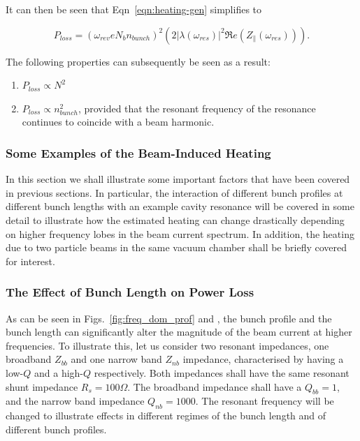 It can then be seen that Eqn~\ref{eqn:heating-gen} simplifies to

\begin{equation}
P_{loss} = \left( \omega_{rev}eN_{b}n_{bunch}  \right)^{2}  \left( 2 \left| \lambda \left( \omega_{res} \right)  \right|^{2}  \Re{}e \left( Z_{\parallel} \left(\omega_{res} \right) \right) \right). 
\label{ean:heating-high-q}
\end{equation}

The following properties can subsequently be seen as a result:

\begin{enumerate}
\item{$P_{loss} \propto N^{2}$}
\item{$P_{loss} \propto n_{bunch}^{2}$, provided that the resonant frequency of the resonance continues to coincide with a beam harmonic.}
\end{enumerate}

\subsubsection{Some Examples of the Beam-Induced Heating}

In this section we shall illustrate some important factors that have been covered in previous sections. In particular, the interaction of different bunch profiles at different bunch lengths with an example cavity resonance will be covered in some detail to illustrate how the estimated heating can change drastically depending on higher frequency lobes in the beam current spectrum. In addition, the heating due to two particle beams in the same vacuum chamber shall be briefly covered for interest.

\subsubsection{The Effect of Bunch Length on Power Loss}

As can be seen in Figs.~\ref{fig:freq_dom_prof} and \label{fig:diff_bunch_len_para}, the bunch profile and the bunch length can significantly alter the magnitude of the beam current at higher frequencies. To illustrate this, let us consider two resonant impedances, one broadband $Z_{bb}$ and one narrow band $Z_{nb}$ impedance, characterised by having a low-$Q$ and a high-$Q$ respectively. Both impedances shall have the same resonant shunt impedance $R_{s} = 100\Omega$. The broadband impedance shall have a $Q_{bb}=1$, and the narrow band impedance $Q_{nb}=1000$. The resonant frequency will be changed to illustrate effects in different regimes of the bunch length and of different bunch profiles.

